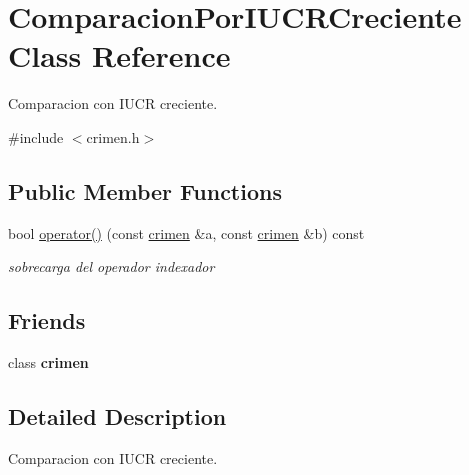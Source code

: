 \hypertarget{classComparacionPorIUCRCreciente}{\section{Comparacion\-Por\-I\-U\-C\-R\-Creciente Class Reference}
\label{classComparacionPorIUCRCreciente}
}


Comparacion con I\-U\-C\-R creciente.  




{\ttfamily \#include $<$crimen.\-h$>$}

\subsection*{Public Member Functions}
\begin{DoxyCompactItemize}
\item 
bool \hyperlink{classComparacionPorIUCRCreciente_abdcb604785922eb527720dbad25f9fb5}{operator()} (const \hyperlink{classcrimen}{crimen} \&a, const \hyperlink{classcrimen}{crimen} \&b) const 
\begin{DoxyCompactList}\small\item\em sobrecarga del operador indexador \end{DoxyCompactList}\end{DoxyCompactItemize}
\subsection*{Friends}
\begin{DoxyCompactItemize}
\item 
\hypertarget{classComparacionPorIUCRCreciente_a95cf0cce33343b561a43ff7566515870}{class {\bfseries crimen}}\label{classComparacionPorIUCRCreciente_a95cf0cce33343b561a43ff7566515870}

\end{DoxyCompactItemize}


\subsection{Detailed Description}
Comparacion con I\-U\-C\-R creciente. 

